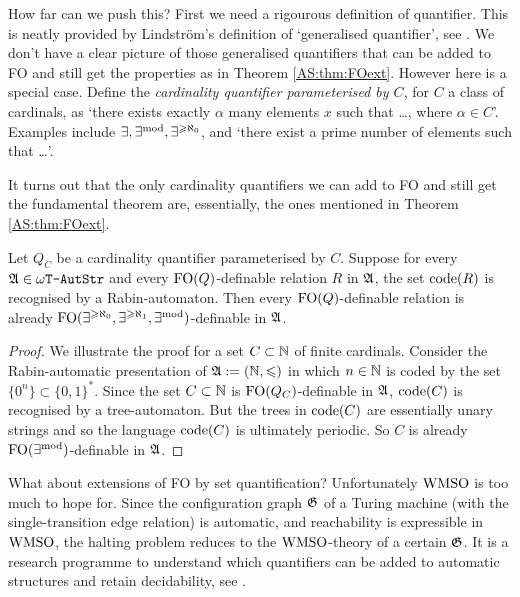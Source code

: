 How far can we push this? First we need a rigourous definition of quantifier.
This is neatly provided by Lindstr\"om's definition of `generalised quantifier',
see \cite{Lind66}. We don't have a clear picture of those generalised quantifiers that can
be added to FO and still get the properties as in Theorem \ref{AS:thm:FOext}.
However here is a special case. Define the
{\em cardinality quantifier parameterised by $C$}, for $C$  a class of
cardinals, as `there exists exactly $\alpha$ many elements $x$ such that \ldots,
where $\alpha \in C$'. Examples include $\exists, \exists^{\text{mod}},\exists^{\geqslant \aleph_0}$, and
`there exist a prime number of elements such that \dots'.

It turns out that the only cardinality quantifiers we can add to FO and still get the fundamental theorem are, essentially, 
the ones mentioned in Theorem \ref{AS:thm:FOext}.

\begin{theorem} 
Let $Q_C$ be a cardinality quantifier parameterised by $C$.  Suppose for every
$\mathfrak{A} \in \mbox{\tt $\omega$T-AutStr}$ and every $\mbox{\rm FO}(Q)$-definable relation $R$ in $\mathfrak{A}$,
the set ${\rm code}({R})$ is recognised by a Rabin-automaton.  Then every $\mbox{\rm FO}(Q)$-definable relation 
is already $\mbox{\rm FO}(\exists^{\geqslant \aleph_0},\exists^{\geqslant \aleph_1},\exists^{\rm mod})$-definable in $\mathfrak{A}$. 
\end{theorem}


\begin{proof} 
We illustrate the proof for a set $C \subset \mathbb{N}$ of finite cardinals.
Consider the Rabin-automatic presentation of  $\mathfrak{A} := (\mathbb{N},\leqslant)$ in which $n \in \mathbb{N}$ is coded
by the set $\{0^n\} \subset \{0,1\}^\ast$. Since the set $C \subset \mathbb{N}$  is $\mbox{\rm FO}(Q_C)$-definable in $\mathfrak{A}$, ${\rm code}({C})$ 
is recognised by a tree-automaton. But the trees in ${\rm code}({C})$ are essentially unary strings and so the language ${\rm code}({C})$ is ultimately periodic. So $C$ is already $\mbox{\rm FO}(\exists^{\text{mod}})$-definable in $\mathfrak{A}$. 
\end{proof}

What about extensions of FO by set quantification?  Unfortunately $\mbox{\rm WMSO}$ is
too much to hope for.  Since the configuration graph $\mathfrak{G}$ of a Turing machine (with the
single-transition edge relation) is automatic, and reachability
is expressible in $\mbox{\rm WMSO}$, the halting problem reduces to the $\mbox{\rm WMSO}$-theory of a certain $\mathfrak{G}$. It is a research programme to understand which quantifiers can be added to automatic structures and retain decidability, see \cite{Rubi04,KuLo08JSL}. 


